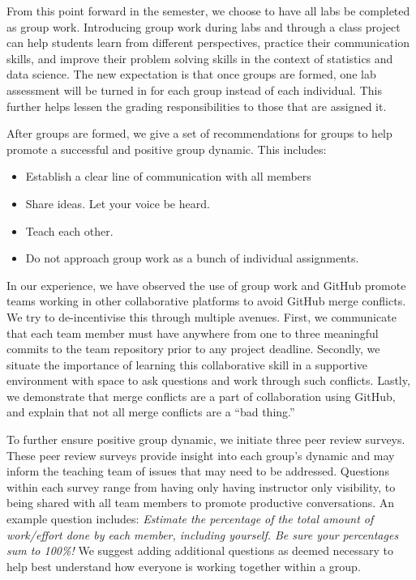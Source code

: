 \documentclass[
  12pt]{article}
\begin{document}
From this point forward in the semester, we choose to have all labs be
completed as group work. Introducing group work during labs and through
a class project can help students learn from different perspectives,
practice their communication skills, and improve their problem solving
skills in the context of statistics and data science. The new
expectation is that once groups are formed, one lab assessment will be
turned in for each group instead of each individual. This further helps
lessen the grading responsibilities to those that are assigned it.

After groups are formed, we give a set of recommendations for groups to
help promote a successful and positive group dynamic. This includes:

\begin{itemize}
\item
  Establish a clear line of communication with all members
\item
  Share ideas. Let your voice be heard.
\item
  Teach each other.
\item
  Do not approach group work as a bunch of individual assignments.
\end{itemize}

In our experience, we have observed the use of group work and GitHub
promote teams working in other collaborative platforms to avoid GitHub
merge conflicts. We try to de-incentivise this through multiple avenues.
First, we communicate that each team member must have anywhere from one
to three meaningful commits to the team repository prior to any project
deadline. Secondly, we situate the importance of learning this
collaborative skill in a supportive environment with space to ask
questions and work through such conflicts. Lastly, we demonstrate that
merge conflicts are a part of collaboration using GitHub, and explain
that not all merge conflicts are a ``bad thing.''

To further ensure positive group dynamic, we initiate three peer review
surveys. These peer review surveys provide insight into each group's
dynamic and may inform the teaching team of issues that may need to be
addressed. Questions within each survey range from having only having
instructor only visibility, to being shared with all team members to
promote productive conversations. An example question includes:
\emph{Estimate the percentage of the total amount of work/effort done by
each member, including yourself. Be sure your percentages sum to 100\%!}
We suggest adding additional questions as deemed necessary to help best
understand how everyone is working together within a group.
\end{document}

